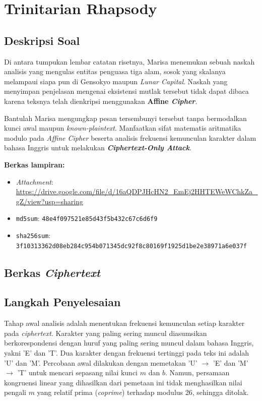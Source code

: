 \section{Trinitarian Rhapsody}

\subsection*{Deskripsi Soal}

Di antara tumpukan lembar catatan risetnya, Marisa menemukan sebuah naskah
analisis yang mengulas entitas penguasa tiga alam, sosok yang skalanya
melampaui siapa pun di Gensokyo maupun \textit{Lunar Capital}. Naskah yang
menyimpan penjelasan mengenai eksistensi mutlak tersebut tidak dapat dibaca
karena teksnya telah dienkripsi menggunakan \textbf{Affine \textit{Cipher}}.

Bantulah Marisa mengungkap pesan tersembunyi tersebut tanpa bermodalkan kunci
awal maupun \textit{known-plaintext}. Manfaatkan sifat matematis aritmatika
modulo pada \textit{Affine Cipher} beserta analisis frekuensi kemunculan
karakter dalam bahasa Inggris untuk melakukan \textbf{\textit{Ciphertext-Only
Attack}}.

\medskip
\noindent\textbf{Berkas lampiran:}
\begin{itemize}[nosep]
  \item \textit{Attachment}: \url{https://drive.google.com/file/d/16aQDPJHcHN2_EmEj2HHTEWeWChkZa_gZ/view?usp=sharing}
  \item \texttt{md5sum}: \texttt{48e4f097521e85d43f5b432c67c6d6f9}
  \item \texttt{sha256sum}: \texttt{3f10313362d08eb284c954b071345dc92f8c80169f1925d1be2e38971a6e037f}
\end{itemize}

\subsection*{Berkas \textit{Ciphertext}}


\subsection*{Langkah Penyelesaian}

Tahap awal analisis adalah menentukan frekuensi kemunculan setiap karakter pada \textit{ciphertext}. Karakter yang paling sering muncul diasumsikan berkorespondensi dengan huruf yang paling sering muncul dalam bahasa Inggris, yakni 'E' dan 'T'. Dua karakter dengan frekuensi tertinggi pada teks ini adalah 'U' dan 'M'. Percobaan awal dilakukan dengan memetakan 'U' $\to$ 'E' dan 'M' $\to$ 'T' untuk mencari sepasang nilai kunci $m$ dan $b$. Namun, persamaan kongruensi linear yang dihasilkan dari pemetaan ini tidak menghasilkan nilai pengali $m$ yang relatif prima (\textit{coprime}) terhadap modulus 26, sehingga ditolak.

